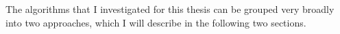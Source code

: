 The algorithms that I investigated for this thesis can be grouped very broadly into two approaches, which I will describe in the following two sections.

